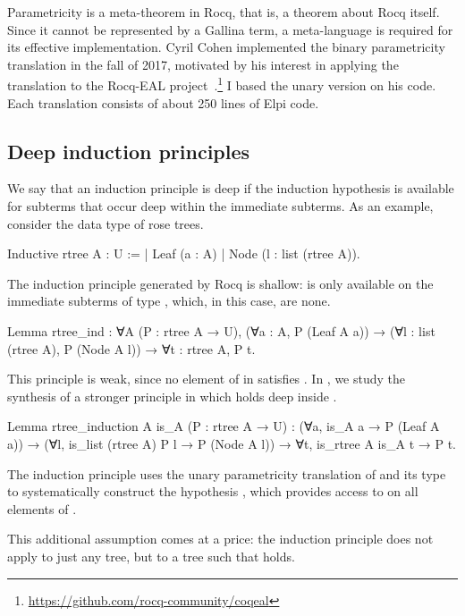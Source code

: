 \documentclass{these-ISSS}
\newenvironment{rocqcode}
  {\VerbatimEnvironment\begin{rocqbox}\begin{xrocqcode}}{\end{xrocqcode}
\end{rocqbox}}
\begin{document}
Parametricity is a meta-theorem in Rocq, that is, a theorem about Rocq itself.
Since it cannot be represented by a Gallina term, a meta-language is required for
its effective implementation. Cyril Cohen implemented the binary parametricity
translation in the fall of 2017, motivated by his interest in applying the
translation to the Rocq-EAL project~\cite{coqeal}.\footnote{\url{https://github.com/rocq-community/coqeal}} I based the unary version on his code. Each
translation consists of about 250 lines of Elpi code.

\subsection{Deep induction principles}


We say that an induction principle is deep if the induction hypothesis is
available for subterms that occur deep within the immediate subterms. As an
example, consider the data type of rose trees.

\begin{rocqcode}
Inductive rtree A : U :=
| Leaf (a : A)
| Node (l : list (rtree A)).
\end{rocqcode}

The induction principle generated by Rocq is shallow:  is only
available on the immediate subterms of type , which, in this case,
are none.

\begin{rocqcode}
Lemma rtree_ind : ∀A (P : rtree A → U),
  (∀a : A, P (Leaf A a)) →
  (∀l : list (rtree A), P (Node A l)) →
  ∀t : rtree A, P t.
\end{rocqcode}

This principle is weak, since no element of  in 
satisfies . In \cite{tassi:hal-01897468}, we study the synthesis of a
stronger principle in which  holds deep inside .

\begin{rocqcode}
Lemma rtree_induction A is_A (P : rtree A → U) :
  (∀a, is_A a → P (Leaf A a)) →
  (∀l, is_list (rtree A) P l → P (Node A l)) →
     ∀t, is_rtree A is_A t → P t.
\end{rocqcode}


The induction principle uses the unary parametricity translation of 
and its type to systematically construct the hypothesis
, which provides access to  on all
elements of .

This additional assumption comes at a price: the induction principle does not
apply to just any tree, but to a tree  such that
 holds.
\end{document}
